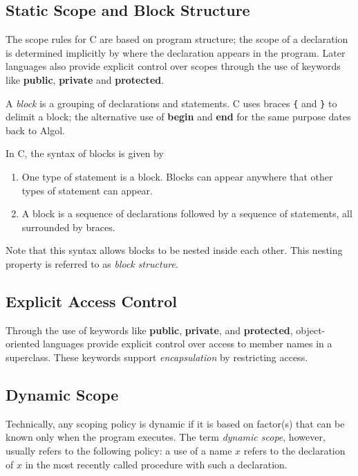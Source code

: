 \documentclass[a4paper,twoside]{book}
\begin{document}
\subsection{Static Scope and Block Structure}
\label{section:1.6.3}

The scope rules for C are based on program structure; the scope of a declaration is determined implicitly by where the declaration appears in the program. Later languages also provide explicit control over scopes through the use of keywords like \textbf{public}, \textbf{private} and \textbf{protected}.

A \textit{block} is a grouping of declarations and statements. C uses braces \texttt{\{} and \texttt{\}} to delimit a block; the alternative use of \textbf{begin} and \textbf{end} for the same purpose dates back to Algol.

In C, the syntax of blocks is given by
\begin{enumerate}
    \item One type of statement is a block. Blocks can appear anywhere that other types of statement can appear.
    \item A block is a sequence of declarations followed by a sequence of statements, all surrounded by braces.
\end{enumerate}

Note that this syntax allows blocks to be nested inside each other. This nesting property is referred to as \textit{block structure}.

\subsection{Explicit Access Control}

Through the use of keywords like \textbf{public}, \textbf{private}, and \textbf{protected}, object-oriented languages provide explicit control over access to member names in a superclass. These keywords support \textit{encapsulation} by restricting access.

\subsection{Dynamic Scope}

Technically, any scoping policy is dynamic if it is based on factor(s) that can be known only when the program executes. The term \textit{dynamic scope}, however, usually refers to the following policy: a use of a name $x$ refers to the declaration of $x$ in the most recently called procedure with such a declaration.
\end{document}
